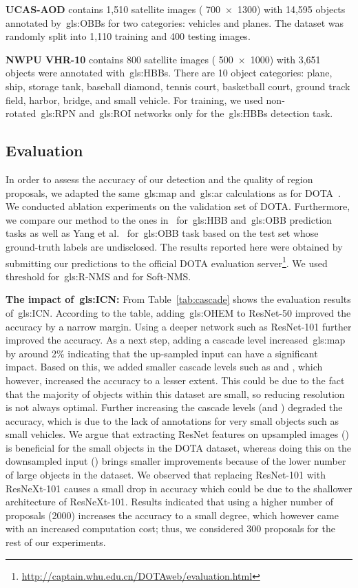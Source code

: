 \documentclass[runningheads]{llncs}
\begin{document}
\textbf{UCAS-AOD} contains 1,510 satellite images ( \SI{700 x 1300}{\px}) with 14,595 objects annotated by~\glspl{gls:OBB} for two categories: vehicles and planes. The dataset was randomly split into 1,110 training and 400 testing images.
    
\textbf{NWPU VHR-10} contains 800 satellite images ( \SI{500 x 1000}{\px}) with 3,651 objects were annotated with~\glspl{gls:HBB}.
There are 10 object categories: plane, ship, storage tank, baseball diamond, tennis court, basketball court, ground track field, harbor, bridge, and small vehicle.
For training, we used non-rotated~\gls{gls:RPN} and~\gls{gls:ROI} networks only for the~\glspl{gls:HBB} detection task.
    
    \subsection{Evaluation}\label{sec:evaluations}
	In order to assess the accuracy of our detection and the quality of region proposals, we adapted the same~\gls{gls:map} and~\gls{gls:ar} calculations as for DOTA~\cite{dota}.
	We conducted ablation experiments on the validation set of DOTA.
	Furthermore, we compare our method to the ones in~\cite{dota} for~\gls{gls:HBB} and~\gls{gls:OBB} prediction tasks as well as Yang et al.~\cite{XueYang2018} for~\gls{gls:OBB} task based on the test set whose ground-truth labels are undisclosed.
	The results reported here were obtained by submitting our predictions to the official DOTA evaluation server\footnote{\url{http://captain.whu.edu.cn/DOTAweb/evaluation.html}}.
  We used  threshold for~\gls{gls:R-NMS} and  for Soft-NMS.
  
	\textbf{The impact of~\gls{gls:ICN}:}
	From Table~\ref{tab:cascade} shows the evaluation results of~\gls{gls:ICN}. According to the table, adding~\gls{gls:OHEM} to ResNet-50 improved the accuracy by a narrow margin.
    Using a deeper network such as ResNet-101 further improved the accuracy.
    As a next step, adding a  cascade level increased~\gls{gls:map} by around 2\% indicating that the up-sampled input can have a significant impact.
    Based on this, we added smaller cascade levels such as  and , which however, increased the accuracy to a lesser extent.
    This could be due to the fact that the majority of  objects within this dataset are small, so reducing resolution is not always optimal.
    Further increasing the cascade levels (\eg  and ) degraded the accuracy, which is due to the lack of annotations for very small objects such as small vehicles.
    We argue that extracting ResNet features on upsampled images () is beneficial for the small objects in the DOTA dataset, whereas doing this on the downsampled input () brings smaller improvements because of the lower number of large objects in the dataset.
	We observed that replacing ResNet-101 with ResNeXt-101 causes a small drop in accuracy which could be due to the shallower architecture of ResNeXt-101.
	Results indicated that using a higher number of proposals (2000) increases the accuracy to a small degree, which however came with an increased computation cost; thus, we considered 300 proposals for the rest of our experiments.
    
\end{document}
